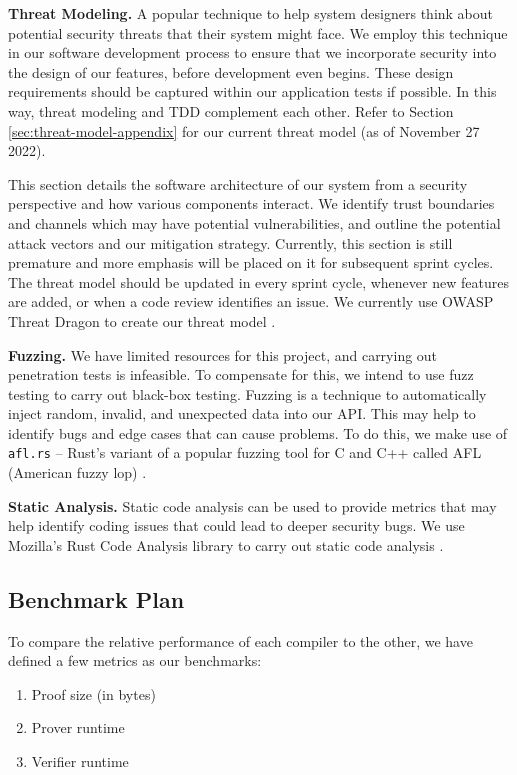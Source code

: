 \textbf{Threat Modeling.} A popular technique to help system designers think about potential security threats that their system might face. We employ this technique in our software development process to ensure that we incorporate security into the design of our features, before development even begins. These design requirements should be captured within our application tests if possible. In this way, threat modeling and TDD complement each other. Refer to Section \ref{sec:threat-model-appendix} for our current threat model (as of November 27 2022). 
    
This section details the software architecture of our system from a security perspective and how various components interact. We identify trust boundaries and channels which may have potential vulnerabilities, and outline the potential attack vectors and our mitigation strategy. Currently, this section is still premature and more emphasis will be placed on it for subsequent sprint cycles. The threat model should be updated in every sprint cycle, whenever new features are added, or when a code review identifies an issue. We currently use OWASP Threat Dragon to create our threat model \cite{OWASP-Dragonv1.6}. 


\textbf{Fuzzing.} We have limited resources for this project, and carrying out penetration tests is infeasible. To compensate for this, we intend to use fuzz testing to carry out black-box testing. Fuzzing is a technique to automatically inject random, invalid, and unexpected data into our API. This may help to identify bugs and edge cases that can cause problems. To do this, we make use of \texttt{afl.rs} \cite{AFL-Rust} -- Rust's variant of a popular fuzzing tool for C and C++ called AFL (American fuzzy lop) \cite{AFL}.

\textbf{Static Analysis.} Static code analysis can be used to provide metrics that may help identify coding issues that could lead to deeper security bugs. We use Mozilla's Rust Code Analysis library to carry out static code analysis \cite{ARDITO2020100635}.







\subsection{Benchmark Plan}
\label{sec:benchmarks}
To compare the relative performance of each compiler to the other, we have defined a few metrics as our benchmarks:
\begin{enumerate}
    \item Proof size (in bytes)
    \item Prover runtime
    \item Verifier runtime
\end{enumerate}


